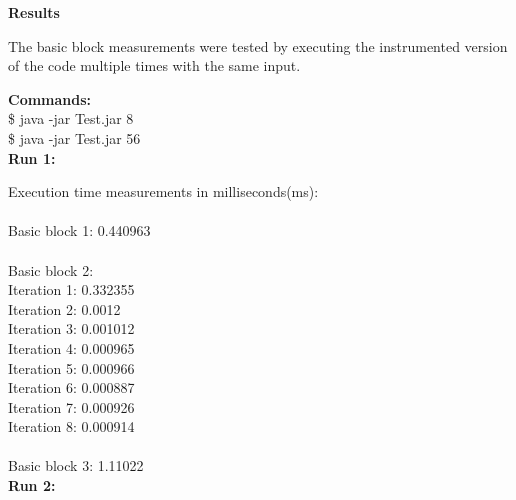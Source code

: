 \documentclass[11pt]{article}
\begin{document}
\textbf{Results}\newline

The basic block measurements were tested by executing the instrumented version of the code multiple times with the same input.\newline

\textbf{Commands:} \\
\$ java -jar Test.jar 8\\
\$ java -jar Test.jar 56\\	  

\textbf{Run 1:}

Execution time measurements in milliseconds(ms):\\
\\Basic block 1: 0.440963 \\
\\Basic block 2:\\
\hspace{2em} Iteration 1: 0.332355\\
\hspace{2em} Iteration 2: 0.0012\\
\hspace{2em} Iteration 3: 0.001012\\
\hspace{2em} Iteration 4: 0.000965\\
\hspace{2em} Iteration 5: 0.000966\\
\hspace{2em} Iteration 6: 0.000887\\
\hspace{2em} Iteration 7: 0.000926\\
\hspace{2em} Iteration 8: 0.000914\\
\\Basic block 3: 1.11022\\

\textbf{Run 2:}
\end{document}
